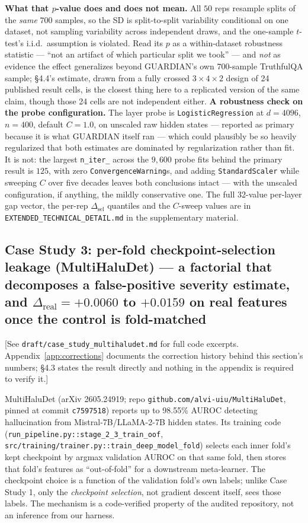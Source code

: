 \documentclass[10pt]{article} %
\begin{document}
\textbf{What that $p$-value does and does not mean.} All $50$ reps resample
splits of the \emph{same} $700$ samples, so the SD is split-to-split
variability conditional on one dataset, not sampling variability across
independent draws, and the one-sample $t$-test's i.i.d.\ assumption is
violated. Read its $p$ as a within-dataset robustness statistic --- ``not an
artifact of which particular split we took'' --- and \emph{not} as evidence the
effect generalizes beyond GUARDIAN's own $700$-sample TruthfulQA sample; §4.4's
estimate, drawn from a fully crossed $3\times4\times2$ design of 24 published
result cells, is the closest thing here to a replicated version of the same
claim, though those 24 cells are not independent either. \textbf{A robustness
check on the probe configuration.} The layer probe is
\texttt{LogisticRegression} at $d=4096$, $n=400$, default $C=1.0$, on unscaled
raw hidden states --- reported as primary because it is what GUARDIAN itself
ran --- which could plausibly be so heavily regularized that both estimates are
dominated by regularization rather than fit. It is not: the largest
\texttt{n\_iter\_} across the $9{,}600$ probe fits behind the primary result is
$125$, with zero \texttt{ConvergenceWarning}s, and adding
\texttt{StandardScaler} while sweeping $C$ over five decades leaves both
conclusions intact --- with the unscaled configuration, if anything, the mildly
conservative one. The full 32-value per-layer gap vector, the per-rep
$\Delta_{\text{sel}}$ quantiles and the $C$-sweep values are in
\texttt{EXTENDED\_TECHNICAL\_DETAIL.md} in the supplementary material.

\subsection{Case Study 3: per-fold checkpoint-selection leakage (MultiHaluDet) --- a factorial that decomposes a false-positive severity estimate, and $\Delta_{\text{real}}=+0.0060$ to $+0.0159$ on real features once the control is fold-matched}

[See \texttt{draft/case\_study\_multihaludet.md} for full code excerpts.
Appendix~\ref{app:corrections} documents the correction history behind this
section's numbers; §4.3 states the result directly and nothing in the appendix
is required to verify it.]

MultiHaluDet (arXiv 2605.24919; repo \texttt{github.com/alvi-uiu/MultiHaluDet},
pinned at commit \texttt{c7597518}) reports up to 98.55\% AUROC detecting
hallucination from Mistral-7B/LLaMA-2-7B hidden states. Its training code
(\texttt{run\_pipeline.py::stage\_2\_3\_train\_oof},
\texttt{src/training/trainer.py::train\_deep\_model\_fold}) selects each inner
fold's kept checkpoint by argmax validation AUROC on that same fold, then
stores that fold's features as ``out-of-fold'' for a downstream meta-learner.
The checkpoint choice is a function of the validation fold's own labels; unlike
Case Study 1, only the \emph{checkpoint selection}, not gradient descent
itself, sees those labels. The mechanism is a code-verified property of the
audited repository, not an inference from our harness.
\end{document}
